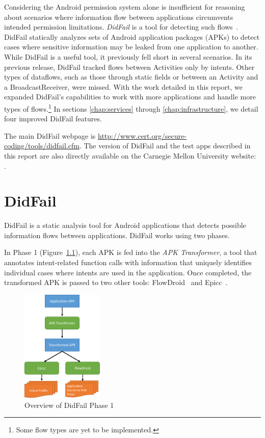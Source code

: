 Considering the Android permission system alone is insufficient for reasoning about scenarios where information flow between applications circumvents intended permission limitations. \emph{DidFail} is a tool for detecting such flows~\cite{didfail}. DidFail statically analyzes sets of Android application packages (APKs) to detect cases where sensitive information may be leaked from one application to another. While DidFail is a useful tool, it previously fell short in several scenarios. In its previous release, DidFail tracked flows between Activities only by intents. Other types of dataflows, such as those through static fields or between an Activity and a BroadcastReceiver, were missed. With the work detailed in this report, we expanded DidFail's capabilities to work with more applications and handle more types of flows.\footnote{Some flow types are yet to be implemented.} In sections \ref{chap:services} through \ref{chap:infrastructure}, we detail four improved DidFail features.

The main DidFail webpage is \url{http://www.cert.org/secure-coding/tools/didfail.cfm}.  The version of DidFail and the test apps described in this report are also directly available on the Carnegie Mellon University website: 
\\ .

\chapter{DidFail}

DidFail is a static analysis tool for Android applications that detects possible information flows between applications. DidFail works using two phases.

In Phase 1 (Figure~\ref{fig:overview_phase1}), each APK is fed into the \emph{APK Transformer}, a tool that annotates intent-related function calls with information that uniquely identifies individual cases where intents are used in the application. Once completed, the transformed APK is passed to two other tools: FlowDroid~\cite{flowdroid} and Epicc~\cite{epicc}.

\begin{figure}[h]
	\centering
	\includegraphics[width=0.35\textwidth]{didfail1.pdf}
	\caption{Overview of DidFail Phase 1}
	\label{fig:overview_phase1}
\end{figure}

